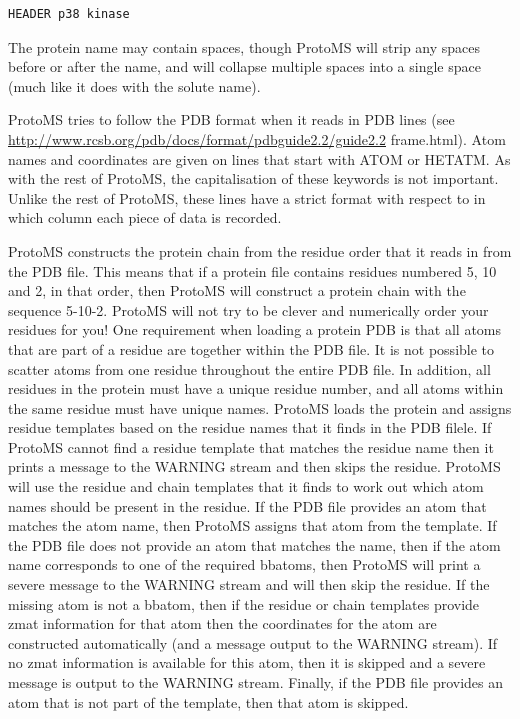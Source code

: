 \documentclass[letterpaper,10pt,english]{sphinxmanual}
\begin{document}
\begin{Verbatim}[commandchars=\\\{\}]
HEADER p38 kinase
\end{Verbatim}

The protein name may contain spaces, though ProtoMS will strip any spaces before or after the name, and will collapse multiple spaces into a single space (much like it does with the solute name).

ProtoMS tries to follow the PDB format when it reads in PDB lines (see \href{http://www.rcsb.org/pdb/docs/format/pdbguide2.2/guide2.2}{http://www.rcsb.org/pdb/docs/format/pdbguide2.2/guide2.2} frame.html). Atom names and coordinates are given on lines that start with ATOM or HETATM. As with the rest of ProtoMS, the capitalisation of these keywords is not important. Unlike the rest of ProtoMS, these lines have a strict format with respect to in which column each piece of data is recorded.

ProtoMS constructs the protein chain from the residue order that it reads in from the PDB file. This means that if a protein file contains residues numbered 5, 10 and 2, in that order, then ProtoMS will construct a protein chain with the sequence 5-10-2. ProtoMS will not try to be clever and numerically order your residues for you! One requirement when loading a protein PDB is that all atoms that are part of a residue are together within the PDB file. It is not possible to scatter atoms from one residue throughout the entire PDB file. In addition, all residues in the protein must have a unique residue number, and all atoms within the same residue must have unique names. ProtoMS loads the protein and assigns residue templates based on the residue names that it finds in the PDB filele. If ProtoMS cannot find a residue template that matches the residue name then it prints a message to the WARNING stream and then skips the residue. ProtoMS will use the residue and chain templates that it finds to work out which atom names should be present in the residue. If the PDB file provides an atom that matches the atom name, then ProtoMS assigns that atom from the template. If the PDB file does not provide an atom that matches the name, then if the atom name corresponds to one of the required bbatoms, then ProtoMS will print a severe message to the WARNING stream and will then skip the residue. If the missing atom is not a bbatom, then if the residue or chain templates provide zmat information for that atom then the coordinates for the atom are constructed automatically (and a message output to the WARNING stream). If no zmat information is available for this atom, then it is skipped and a severe message is output to the WARNING stream. Finally, if the PDB file provides an atom that is not part of the template, then that atom is skipped.
\end{document}
